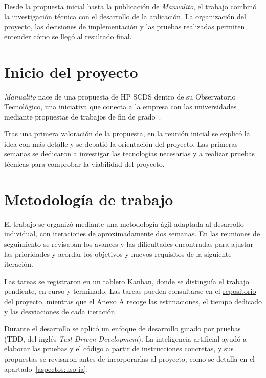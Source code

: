 
Desde la propuesta inicial hasta la publicación de \textit{Manualito}, el
trabajo combinó la investigación técnica con el desarrollo de la aplicación.
La organización del proyecto, las decisiones de implementación y las pruebas
realizadas permiten entender cómo se llegó al resultado final.

\section{Inicio del proyecto}
\label{aspectos:inicio}

\textit{Manualito} nace de una propuesta de HP SCDS dentro de su
Observatorio Tecnológico, una iniciativa que conecta a la empresa con las
universidades mediante propuestas de trabajos de fin de
grado~\cite{hp_observatorio_tecnologico}.

Tras una primera valoración de la propuesta, en la reunión inicial se
explicó la idea con más detalle y se debatió la orientación del proyecto.
Las primeras semanas se dedicaron a investigar las tecnologías necesarias
y a realizar pruebas técnicas para comprobar la viabilidad del proyecto.

\section{Metodología de trabajo}
\label{aspectos:metodologia}

El trabajo se organizó mediante una metodología ágil adaptada al desarrollo
individual, con iteraciones de aproximadamente dos semanas. En las reuniones
de seguimiento se revisaban los avances y las dificultades encontradas para
ajustar las prioridades y acordar los objetivos y nuevos requisitos de la
siguiente iteración.

Las tareas se registraron en un tablero Kanban, donde se distinguía el
trabajo pendiente, en curso y terminado. Las tareas pueden consultarse
en el \href{https://github.com/ibaimoya/manualito/milestones?state=closed}{repositorio del
proyecto}, mientras que el Anexo A recoge las estimaciones, el tiempo
dedicado y las desviaciones de cada iteración.

Durante el desarrollo se aplicó un enfoque de desarrollo guiado por
pruebas (\acs{TDD}, del inglés \textit{Test-Driven Development}).
La inteligencia artificial ayudó a elaborar las pruebas y el código a partir
de instrucciones concretas, y sus propuestas se revisaron antes de
incorporarlas al proyecto, como se detalla en el apartado~\ref{aspectos:uso-ia}.

